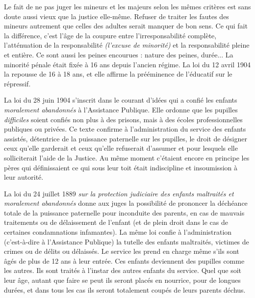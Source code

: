  Le fait de ne pas juger les mineurs et les majeurs selon les mêmes critères est sans doute aussi vieux que la justice elle-même. Refuser de traiter les fautes des mineurs autrement que celles des adultes serait manquer de bon sens. Ce qui fait la différence, c'est l'âge de la coupure entre l'irresponsabilité complète, l'atténuation de la responsabilité \emph{(l'excuse de minorité)} et la responsabilité pleine et entière. Ce sont aussi les peines encourues : nature des peines, durée... La minorité pénale était fixée à 16 ans depuis l'ancien régime. La loi du 12 avril 1904 la repousse de 16 à 18 ans, et elle affirme la prééminence de l'éducatif sur le répressif.

 La loi du 28 juin 1904 s'inscrit dans le courant d'idées qui a confié les enfants \emph{moralement abandonnés} à l'Assistance Publique. Elle ordonne que les pupilles \emph{difficiles} soient confiés non plus à des prisons, mais à des écoles professionnelles publiques ou privées. Ce texte confirme à l'administration du service des enfants assistés, détentrice de la puissance paternelle sur les pupilles, le droit de désigner ceux qu'elle garderait et ceux qu'elle refuserait d'assumer et pour lesquels elle solliciterait l'aide de la Justice. Au même moment c'étaient encore en principe les pères qui définissaient ce qui sous leur toit était indiscipline et insoumission à leur autorité.

 La loi du 24 juillet 1889 {\emph{sur la protection judiciaire des enfants maltraités et moralement abandonnés}} donne aux juges la possibilité de prononcer la déchéance totale de la puissance paternelle pour inconduite des parents, en cas de mauvais traitements ou de délaissement de l'enfant (et de plein droit dans le cas de certaines condamnations infamantes). La même loi confie à l'administration (c'est-à-dire à l'Assistance Publique) la tutelle des enfants maltraités, victimes de crimes ou de délits ou délaissés. Le service les prend en charge même s'ils sont âgés de plus de 12 ans à leur entrée. Ces enfants deviennent des pupilles comme les autres. Ils sont traités à l'instar des autres enfants du service. Quel que soit leur âge, autant que faire se peut ils seront placés en nourrice, pour de longues durées, et dans tous les cas ils seront totalement coupés de leurs parents déchus.


